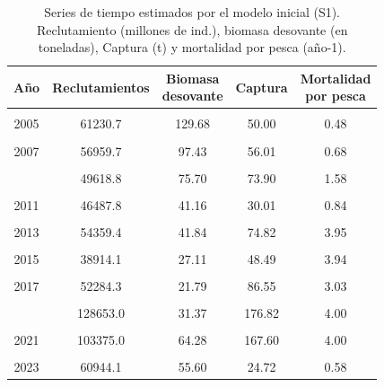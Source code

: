 \documentclass[
]{article}
\begin{document}
\begin{table}[ht!]
\caption{\label{tab:unnamed-chunk-11}\label{Tab4}Series de tiempo estimados por el modelo inicial (S1). Reclutamiento (millones de ind.),  biomasa desovante (en toneladas), Captura (t) y mortalidad por pesca (año-1).}
\centering
\fontsize{9}{11}\selectfont
\begin{tabular}[t]{ccccc}
\toprule
Año & Reclutamientos & \makecell[c]{Biomasa\\desovante} & Captura & \makecell[c]{Mortalidad\\por pesca}\\
\midrule
\cellcolor{gray!6}{2004} & \cellcolor{gray!6}{62296.6} & \cellcolor{gray!6}{131.49} & \cellcolor{gray!6}{23.00} & \cellcolor{gray!6}{0.19}\\
2005 & 61230.7 & 129.68 & 50.00 & 0.48\\
\cellcolor{gray!6}{2006} & \cellcolor{gray!6}{59486.4} & \cellcolor{gray!6}{116.10} & \cellcolor{gray!6}{38.00} & \cellcolor{gray!6}{0.41}\\
2007 & 56959.7 & 97.43 & 56.01 & 0.68\\
\cellcolor{gray!6}{2008} & \cellcolor{gray!6}{53952.3} & \cellcolor{gray!6}{91.39} & \cellcolor{gray!6}{70.11} & \cellcolor{gray!6}{1.09}\\
\addlinespace
2009 & 49618.8 & 75.70 & 73.90 & 1.58\\
\cellcolor{gray!6}{2010} & \cellcolor{gray!6}{46620.0} & \cellcolor{gray!6}{57.28} & \cellcolor{gray!6}{80.40} & \cellcolor{gray!6}{2.65}\\
2011 & 46487.8 & 41.16 & 30.01 & 0.84\\
\cellcolor{gray!6}{2012} & \cellcolor{gray!6}{47197.6} & \cellcolor{gray!6}{33.12} & \cellcolor{gray!6}{85.27} & \cellcolor{gray!6}{2.95}\\
2013 & 54359.4 & 41.84 & 74.82 & 3.95\\
\addlinespace
\cellcolor{gray!6}{2014} & \cellcolor{gray!6}{31108.3} & \cellcolor{gray!6}{26.72} & \cellcolor{gray!6}{80.63} & \cellcolor{gray!6}{4.00}\\
2015 & 38914.1 & 27.11 & 48.49 & 3.94\\
\cellcolor{gray!6}{2016} & \cellcolor{gray!6}{58124.2} & \cellcolor{gray!6}{17.08} & \cellcolor{gray!6}{34.99} & \cellcolor{gray!6}{1.57}\\
2017 & 52284.3 & 21.79 & 86.55 & 3.03\\
\cellcolor{gray!6}{2018} & \cellcolor{gray!6}{119431.0} & \cellcolor{gray!6}{37.18} & \cellcolor{gray!6}{72.14} & \cellcolor{gray!6}{2.85}\\
\addlinespace
2019 & 128653.0 & 31.37 & 176.82 & 4.00\\
\cellcolor{gray!6}{2020} & \cellcolor{gray!6}{111082.0} & \cellcolor{gray!6}{59.33} & \cellcolor{gray!6}{191.15} & \cellcolor{gray!6}{4.00}\\
2021 & 103375.0 & 64.28 & 167.60 & 4.00\\
\cellcolor{gray!6}{2022} & \cellcolor{gray!6}{46126.8} & \cellcolor{gray!6}{56.98} & \cellcolor{gray!6}{135.34} & \cellcolor{gray!6}{2.91}\\
2023 & 60944.1 & 55.60 & 24.72 & 0.58\\
\bottomrule
\end{tabular}
\end{table}
\end{document}
